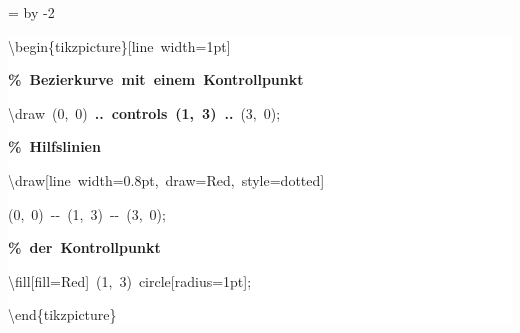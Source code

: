 \begingroup
\ttfamily
{}
=\textwidth
\advance{} by -2\fboxsep
\noindent
\colorbox{background}
{%
\parbox{\dimen255}
{%
\rule[-0.5ex]{0pt}{2.5ex}\hspace*{0.0em}\textbackslash{}begin\{tikzpicture\}[line~width=1pt]\\
\rule[-0.5ex]{0pt}{2.5ex}\hspace*{1.0em}\textcolor{G}{\textbf{\%~Bezierkurve~mit~einem~Kontrollpunkt}}\\
\rule[-0.5ex]{0pt}{2.5ex}\hspace*{1.0em}\textbackslash{}draw~(0,~0)~\textcolor{R}{\textbf{..~controls~(1,~3)~..}}~(3,~0);\\
\rule[-0.5ex]{0pt}{2.5ex}\hspace*{1.0em}\textcolor{G}{\textbf{\%~Hilfslinien}}\\
\rule[-0.5ex]{0pt}{2.5ex}\hspace*{1.0em}\textbackslash{}draw[line~width=0.8pt,~draw=Red,~style=dotted]\\
\rule[-0.5ex]{0pt}{2.5ex}\hspace*{3.5em}(0,~0)~{-}{-}~(1,~3)~{-}{-}~(3,~0);\\
\rule[-0.5ex]{0pt}{2.5ex}\hspace*{1.0em}\textcolor{G}{\textbf{\%~der~Kontrollpunkt}}\\
\rule[-0.5ex]{0pt}{2.5ex}\hspace*{1.0em}\textbackslash{}fill[fill=Red]~(1,~3)~circle[radius=1pt];\\
\rule[-0.5ex]{0pt}{2.5ex}\hspace*{0.0em}\textbackslash{}end\{tikzpicture\}}%
}%
\endgroup
